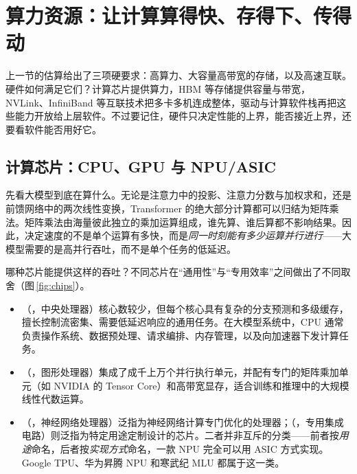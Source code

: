 \section{算力资源：让计算算得快、存得下、传得动}
\label{sec:hw}

\begin{guide}
\begin{minipage}[c]{0.66\linewidth}
\noindent 上一节的估算给出了三项硬要求：高算力、大容量高带宽的存储，以及高速互联。硬件如何满足它们？计算芯片提供算力，HBM 等存储提供容量与带宽，NVLink、InfiniBand 等互联技术把多卡多机连成整体，驱动与计算软件栈再把这些能力开放给上层软件。不过要记住，硬件只决定性能的上界，能否接近上界，还要看软件能否用好它。
\end{minipage}\hfill
\begin{minipage}[c]{0.3\linewidth}\centering{}\end{minipage}
\end{guide}

\subsection{计算芯片：CPU、GPU 与 NPU/ASIC}
\label{subsec:chips}

先看大模型到底在算什么。无论是注意力中的投影、注意力分数与加权求和，还是前馈网络中的两次线性变换，Transformer 的绝大部分计算都可以归结为矩阵乘法。矩阵乘法由海量彼此独立的乘加运算组成，谁先算、谁后算都不影响结果。因此，决定速度的不是单个运算有多快，而是\emph{同一时刻能有多少运算并行进行}——大模型需要的是高并行吞吐，而不是单个任务的低延迟。

哪种芯片能提供这样的吞吐？不同芯片在“通用性”与“专用效率”之间做出了不同取舍（图\,\ref{fig:chips}）。
\begin{itemize}
  \item {}（，中央处理器）核心数较少，但每个核心具有复杂的分支预测和多级缓存，擅长控制流密集、需要低延迟响应的通用任务。在大模型系统中，CPU 通常负责操作系统、数据预处理、请求编排、内存管理，以及向加速器下发计算任务。
  \item {}（，图形处理器）集成了成千上万个并行执行单元，并配有专门的矩阵乘加单元（如 NVIDIA 的 Tensor Core）和高带宽显存，适合训练和推理中的大规模线性代数运算\cite{hwu2026pmpp}。
  \item {}（，神经网络处理器）泛指为神经网络计算专门优化的处理器；（，专用集成电路）则泛指为特定用途定制设计的芯片。二者并非互斥的分类——前者按\emph{用途}命名，后者按\emph{实现方式}命名，一款 NPU 完全可以用 ASIC 方式实现。Google TPU、华为昇腾 NPU 和寒武纪 MLU 都属于这一类。
\end{itemize}

